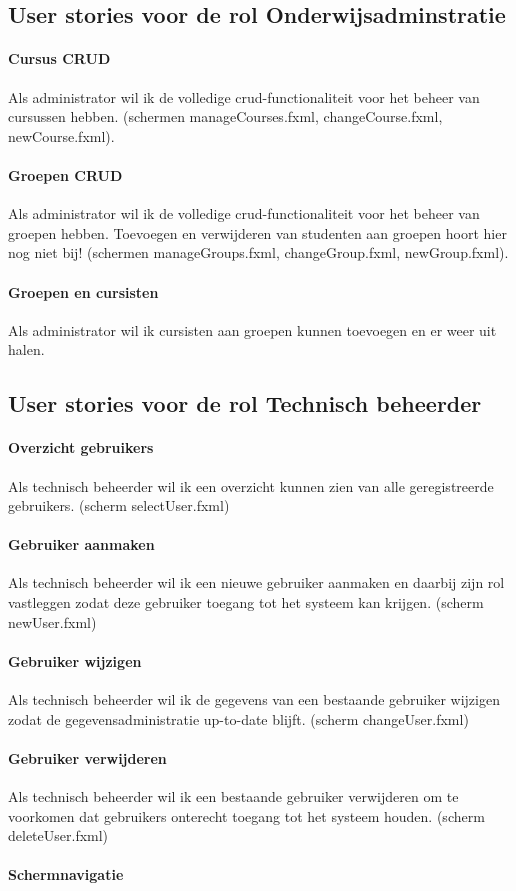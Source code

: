 \documentclass[11pt, a4paper]{article}
\begin{document}
\subsection{User stories voor de rol Onderwijsadminstratie}

\paragraph{Cursus CRUD}
Als administrator wil ik de volledige crud-functionaliteit voor het beheer van cursussen hebben. (schermen manageCourses.fxml, changeCourse.fxml, newCourse.fxml).

\paragraph{Groepen CRUD}
Als administrator wil ik de volledige crud-functionaliteit voor het beheer van groepen hebben. Toevoegen en verwijderen van studenten aan groepen hoort hier nog niet bij! (schermen manageGroups.fxml, changeGroup.fxml, newGroup.fxml).

\paragraph{Groepen en cursisten}
Als administrator wil ik cursisten aan groepen kunnen toevoegen en er weer uit halen.

\subsection{User stories voor de rol Technisch beheerder}

\paragraph{Overzicht gebruikers} Als technisch beheerder wil ik een overzicht kunnen zien van alle geregistreerde gebruikers. (scherm selectUser.fxml)

\paragraph{Gebruiker aanmaken} Als technisch beheerder wil ik een nieuwe gebruiker aanmaken en daarbij zijn rol vastleggen zodat deze gebruiker toegang tot het systeem kan krijgen. (scherm newUser.fxml)

\paragraph{Gebruiker wijzigen} Als technisch beheerder wil ik de gegevens van een bestaande gebruiker wijzigen zodat de gegevensadministratie up-to-date blijft. (scherm changeUser.fxml)

\paragraph{Gebruiker verwijderen} Als technisch beheerder wil ik een bestaande gebruiker verwijderen om te voorkomen dat gebruikers onterecht toegang tot het systeem houden. (scherm deleteUser.fxml)

\paragraph{Schermnavigatie} 
\end{document}
